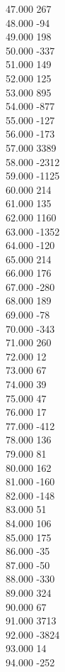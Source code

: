 { 47.000	267 \\
 48.000	-94 \\
 49.000	198 \\
 50.000	-337 \\
 51.000	149 \\
 52.000	125 \\
 53.000	895 \\
 54.000	-877 \\
 55.000	-127 \\
 56.000	-173 \\
 57.000	3389 \\
 58.000	-2312 \\
 59.000	-1125 \\
 60.000	214 \\
 61.000	135 \\
 62.000	1160 \\
 63.000	-1352 \\
 64.000	-120 \\
 65.000	214 \\
 66.000	176 \\
 67.000	-280 \\
 68.000	189 \\
 69.000	-78 \\
 70.000	-343 \\
 71.000	260 \\
 72.000	12 \\
 73.000	67 \\
 74.000	39 \\
 75.000	47 \\
 76.000	17 \\
 77.000	-412 \\
 78.000	136 \\
 79.000	81 \\
 80.000	162 \\
 81.000	-160 \\
 82.000	-148 \\
 83.000	51 \\
 84.000	106 \\
 85.000	175 \\
 86.000	-35 \\
 87.000	-50 \\
 88.000	-330 \\
 89.000	324 \\
 90.000	67 \\
 91.000	3713 \\
 92.000	-3824 \\
 93.000	14 \\
 94.000	-252 \\
}
